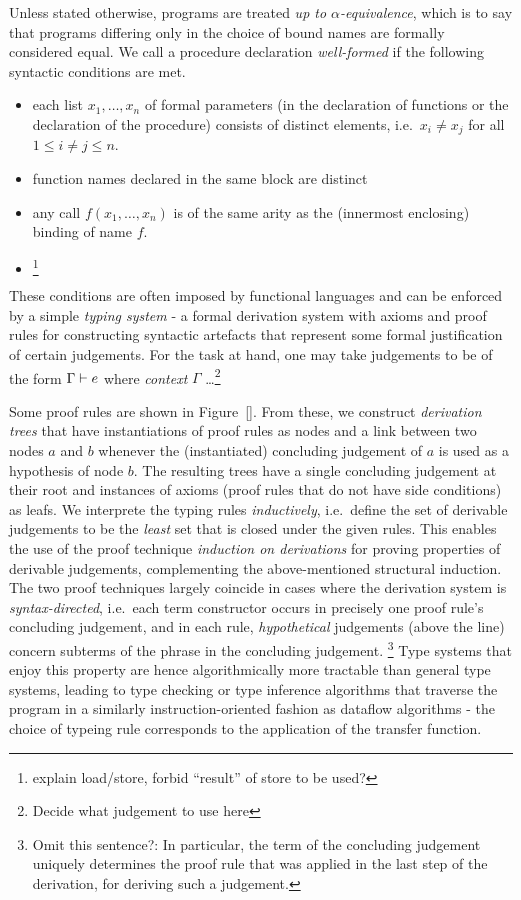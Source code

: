 Unless stated otherwise, programs are treated 
\emph{up to $\alpha$-equivalence}, which is to say that programs differing only in the choice of bound names are formally considered equal.  We call a
procedure declaration \emph{well-formed} if  the
following syntactic conditions are met.
\begin{itemize}
\item each list $x_1,\ldots,x_n$ of formal parameters (in the declaration of functions or the declaration of the procedure) consists of distinct elements, i.e.~$x_i \neq x_j$ for all $1 \le i \neq j \le n$.
\item function names declared in the same block are distinct
\item any call $f(x_1,\ldots,x_n)$ is of the same arity as the (innermost enclosing) binding of name $f$.
\item \footnote {explain load/store, forbid ``result'' of store to be used?}
\end{itemize}
These conditions are often imposed by functional languages and can be
enforced by a simple \emph{typing system} - a formal derivation system
with axioms and proof rules for constructing syntactic artefacts that
represent some formal justification of certain judgements. For the
task at hand, one may take judgements to be of the form ${\Gamma} \vdash {e}$ where \emph{context} $\Gamma$ \ldots\footnote{Decide what judgement to use here}

Some proof rules are shown in Figure~\ref{}. From these, we construct
\emph{derivation trees} that have instantiations of proof rules as
nodes and a link between two nodes $a$ and $b$ whenever the
(instantiated) concluding judgement of $a$ is used as a hypothesis of
node $b$. The resulting trees have a single concluding
judgement at their root and instances of axioms (proof rules that do
not have side conditions) as leafs. We interprete the typing rules
\emph{inductively}, i.e.~define the set of derivable judgements to be
the \emph{least} set that is closed under the given rules. This
enables the use of the proof technique
\emph{induction on derivations} for proving properties of derivable judgements, complementing the above-mentioned structural induction.
The two proof techniques largely coincide in cases where the
derivation system is \emph{syntax-directed}, i.e.~each term
constructor occurs in precisely one proof rule's concluding judgement,
and in each rule,
\emph{hypothetical} judgements (above the line) concern subterms of the phrase in the concluding judgement. \footnote{Omit this sentence?: In particular, the term of the concluding judgement uniquely determines the proof rule that was applied in the last step of the derivation, for deriving such a judgement. }
Type systems that enjoy this property are hence algorithmically more
tractable than general type systems, leading to type checking or type
inference algorithms that traverse the program in a similarly
instruction-oriented fashion as dataflow algorithms - the choice of
typeing rule corresponds to the application of the transfer function.

